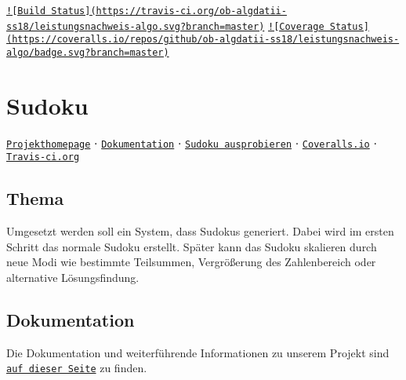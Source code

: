 \href{https://travis-ci.org/ob-algdatii-ss18/leistungsnachweis-algo}{\tt !\mbox{[}Build Status\mbox{]}(https\-://travis-\/ci.\-org/ob-\/algdatii-\/ss18/leistungsnachweis-\/algo.\-svg?branch=master)} \href{https://coveralls.io/github/ob-algdatii-ss18/leistungsnachweis-algo?branch=master}{\tt !\mbox{[}Coverage Status\mbox{]}(https\-://coveralls.\-io/repos/github/ob-\/algdatii-\/ss18/leistungsnachweis-\/algo/badge.\-svg?branch=master)}

\section*{Sudoku}

\href{https://ob-algdatii-ss18.github.io/leistungsnachweis-algo/}{\tt Projekthomepage} ⋅ \href{https://ob-algdatii-ss18.github.io/leistungsnachweis-algo/doxygen_doc/html/index.html}{\tt Dokumentation} ⋅ \href{https://ob-algdatii-ss18.github.io/leistungsnachweis-algo/}{\tt Sudoku ausprobieren} ⋅ \href{https://coveralls.io/github/ob-algdatii-ss18/leistungsnachweis-algo/}{\tt Coveralls.\-io} ⋅ \href{https://travis-ci.org/ob-algdatii-ss18/leistungsnachweis-algo}{\tt Travis-\/ci.\-org} \subsection*{Thema}

Umgesetzt werden soll ein System, dass Sudokus generiert. Dabei wird im ersten Schritt das normale Sudoku erstellt. Später kann das Sudoku skalieren durch neue Modi wie bestimmte Teilsummen, Vergrößerung des Zahlenbereich oder alternative Lösungsfindung. \subsection*{Dokumentation}

Die Dokumentation und weiterführende Informationen zu unserem Projekt sind \href{https://ob-algdatii-ss18.github.io/leistungsnachweis-algo/}{\tt auf dieser Seite} zu finden. 